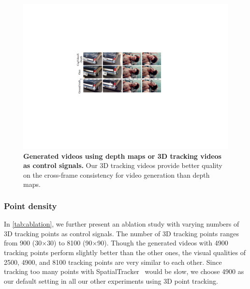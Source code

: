 \begin{figure}
    \centering
    \includegraphics[width=\linewidth]{pictures/i2v1.pdf}
    \caption{\textbf{Generated videos using depth maps or 3D tracking videos as control signals.} Our 3D tracking videos provide better quality on the cross-frame consistency for video generation than depth maps.}
    \vspace{-15pt}
    \label{fig:depth-tracking}
\end{figure}

\subsubsection{Point density}

In \autoref{tab:ablation}, we further present an ablation study with varying numbers of 3D tracking points as control signals. The number of 3D tracking points ranges from 900 (30$\times$30) to 8100 (90$\times$90). Though the generated videos with 4900 tracking points perform slightly better than the other ones, the visual qualities of 2500, 4900, and 8100 tracking points are very similar to each other. Since tracking too many points with SpatialTracker~\cite{xiao2024spatialtracker} would be slow, we choose 4900 as our default setting in all our other experiments using 3D point tracking. 

